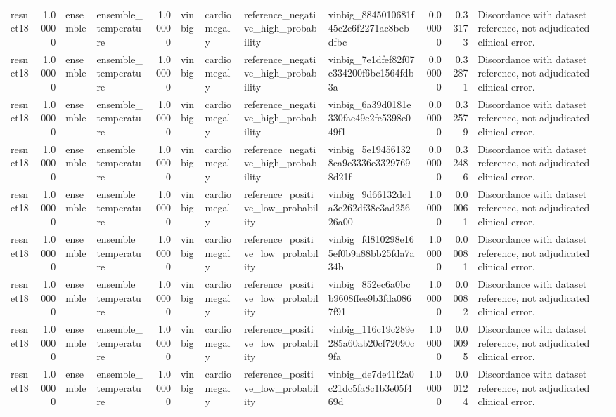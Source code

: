 \begin{tabular}{lrllrllllrrl}
resnet18 & 1.00000 & ensemble & ensemble\_temperature & 1.00000 & vinbig & cardiomegaly & reference\_negative\_high\_probability & vinbig\_8845010681f45c2c6f2271ac8bebdfbc & 0.00000 & 0.33173 & Discordance with dataset reference, not adjudicated clinical error. \\
resnet18 & 1.00000 & ensemble & ensemble\_temperature & 1.00000 & vinbig & cardiomegaly & reference\_negative\_high\_probability & vinbig\_7e1dfef82f07c334200f6bc1564fdb3a & 0.00000 & 0.32871 & Discordance with dataset reference, not adjudicated clinical error. \\
resnet18 & 1.00000 & ensemble & ensemble\_temperature & 1.00000 & vinbig & cardiomegaly & reference\_negative\_high\_probability & vinbig\_6a39d0181e330fae49e2fe5398e049f1 & 0.00000 & 0.32579 & Discordance with dataset reference, not adjudicated clinical error. \\
resnet18 & 1.00000 & ensemble & ensemble\_temperature & 1.00000 & vinbig & cardiomegaly & reference\_negative\_high\_probability & vinbig\_5e194561328ca9c3336e33297698d21f & 0.00000 & 0.32486 & Discordance with dataset reference, not adjudicated clinical error. \\
resnet18 & 1.00000 & ensemble & ensemble\_temperature & 1.00000 & vinbig & cardiomegaly & reference\_positive\_low\_probability & vinbig\_9d66132dc1a3e262df38c3ad25626a00 & 1.00000 & 0.00061 & Discordance with dataset reference, not adjudicated clinical error. \\
resnet18 & 1.00000 & ensemble & ensemble\_temperature & 1.00000 & vinbig & cardiomegaly & reference\_positive\_low\_probability & vinbig\_fd810298e165ef0b9a88bb25fda7a34b & 1.00000 & 0.00081 & Discordance with dataset reference, not adjudicated clinical error. \\
resnet18 & 1.00000 & ensemble & ensemble\_temperature & 1.00000 & vinbig & cardiomegaly & reference\_positive\_low\_probability & vinbig\_852ec6a0bcb9608ffee9b3fda0867f91 & 1.00000 & 0.00082 & Discordance with dataset reference, not adjudicated clinical error. \\
resnet18 & 1.00000 & ensemble & ensemble\_temperature & 1.00000 & vinbig & cardiomegaly & reference\_positive\_low\_probability & vinbig\_116c19c289e285a60ab20cf72090c9fa & 1.00000 & 0.00095 & Discordance with dataset reference, not adjudicated clinical error. \\
resnet18 & 1.00000 & ensemble & ensemble\_temperature & 1.00000 & vinbig & cardiomegaly & reference\_positive\_low\_probability & vinbig\_de7de41f2a0c21dc5fa8c1b3e05f469d & 1.00000 & 0.00124 & Discordance with dataset reference, not adjudicated clinical error. \\

\end{tabular}
